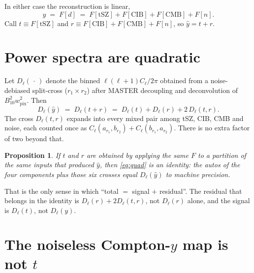 \documentclass[11pt,a4paper]{article}
\newtheorem{proposition}{Proposition}
\begin{document}
In either case the reconstruction is linear,
\begin{equation}
  \hat y \;=\; F[d]
  \;=\; F[\mathrm{tSZ}] + F[\mathrm{CIB}] + F[\mathrm{CMB}] + F[n].
  \label{eq:lin}
\end{equation}
Call \(t \equiv F[\mathrm{tSZ}]\) and \(r \equiv F[\mathrm{CIB}]+F[\mathrm{CMB}]+F[n]\),
so \(\hat y = t+r\).

\section{Power spectra are quadratic}

Let \(D_\ell(\,\cdot\,)\) denote the binned
\(\ell(\ell+1)C_\ell/2\pi\) obtained from a noise-debiased split-cross
(\(r_1\times r_2\)) after MASTER decoupling and deconvolution of
\(B_{10}^2 w_{\mathrm{pix}}^2\). Then
\begin{equation}
  D_\ell(\hat y)
  \;=\;
  D_\ell(t+r)
  \;=\;
  D_\ell(t) + D_\ell(r) + 2\, D_\ell(t,r).
  \label{eq:quad}
\end{equation}
The cross \(D_\ell(t,r)\) expands into every mixed pair among tSZ, CIB, CMB
and noise, each counted once as
\(C_\ell(a_{r_1},b_{r_2})+C_\ell(b_{r_1},a_{r_2})\). There is no extra
factor of two beyond that.

\begin{proposition}
\label{prop:closed}
If \(t\) and \(r\) are obtained by applying the \emph{same} \(F\) to a
partition of the \emph{same} inputs that produced \(\hat y\), then
\eqref{eq:quad} is an identity: the autos of the four components plus those
six crosses equal \(D_\ell(\hat y)\) to machine precision.
\end{proposition}

That is the only sense in which ``total \(=\) signal \(+\) residual''.
The residual that belongs in the identity is \(D_\ell(r)+2D_\ell(t,r)\),
not \(D_\ell(r)\) alone, and the signal is \(D_\ell(t)\), not \(D_\ell(y)\).

\section{The noiseless Compton-\(y\) map is not \(t\)}
\end{document}
